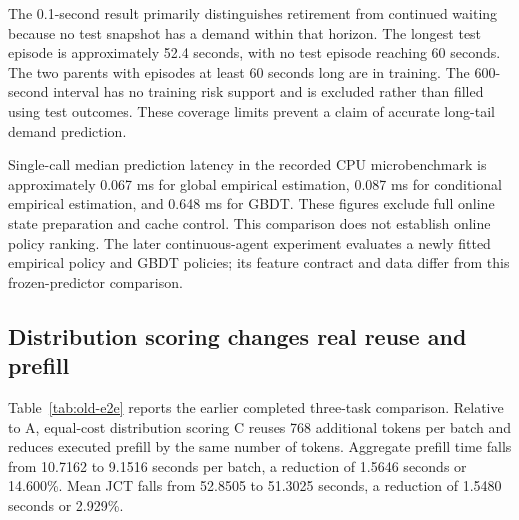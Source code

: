 \documentclass[sigconf, screen, review, balance=false]{acmart}
\begin{document}
The 0.1-second result primarily distinguishes retirement from continued
waiting because no test snapshot has a demand within that horizon. The
longest test episode is approximately 52.4 seconds, with no test episode
reaching 60 seconds. The two parents with episodes at least 60 seconds
long are in training. The 600-second interval has no training risk
support and is excluded rather than filled using test outcomes. These
coverage limits prevent a claim of accurate long-tail demand prediction.

Single-call median prediction latency in the recorded CPU microbenchmark
is approximately 0.067 ms for global empirical estimation, 0.087 ms for
conditional empirical estimation, and 0.648 ms for GBDT. These figures
exclude full online state preparation and cache control. This comparison does not establish online policy ranking. The later
continuous-agent experiment evaluates a newly fitted empirical policy
and GBDT policies; its feature contract and data differ from this
frozen-predictor comparison.

\subsection{Distribution scoring changes real reuse and
prefill}\label{distribution-scoring-changes-real-reuse-and-prefill}

Table~\ref{tab:old-e2e} reports the earlier completed three-task comparison. Relative to A,
equal-cost distribution scoring C reuses 768 additional tokens per batch
and reduces executed prefill by the same number of tokens. Aggregate
prefill time falls from 10.7162 to 9.1516 seconds per batch, a reduction
of 1.5646 seconds or 14.600\%. Mean JCT falls from 52.8505 to 51.3025
seconds, a reduction of 1.5480 seconds or 2.929\%.
\end{document}
